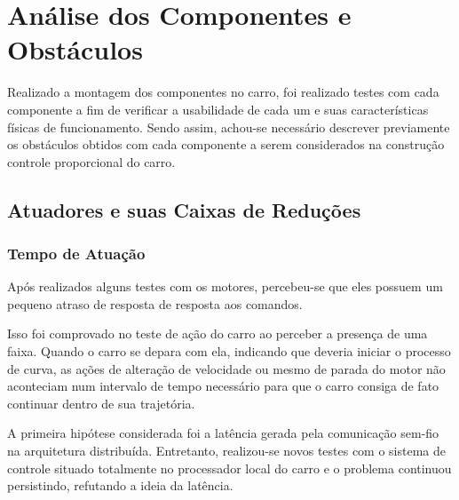 



\section{Análise dos Componentes e Obstáculos} \label{sec:obstaculos}
	Realizado a montagem dos componentes no carro, foi realizado testes com cada componente a fim de verificar a usabilidade de cada um e suas características físicas de funcionamento. Sendo assim, achou-se necessário descrever previamente os obstáculos obtidos com cada componente a serem considerados na construção controle proporcional do carro.

	\subsection{Atuadores e suas Caixas de Reduções} \label{sec:problema_motor}
        \subsubsection{Tempo de Atuação}
			Após realizados alguns testes com os motores, percebeu-se que eles possuem um pequeno atraso de resposta de resposta aos comandos. 
            
            Isso foi comprovado no teste de ação do carro ao perceber a presença de uma faixa. Quando o carro se depara com ela, indicando que deveria iniciar o processo de curva, as ações de alteração de velocidade ou mesmo de parada do motor não aconteciam num intervalo de tempo necessário para que o carro consiga de fato continuar dentro de sua trajetória. 

			A primeira hipótese considerada foi a latência gerada pela comunicação sem-fio na arquitetura distribuída. Entretanto, realizou-se novos testes com o sistema de controle situado totalmente no processador local do carro e o problema continuou persistindo, refutando a ideia da latência.

